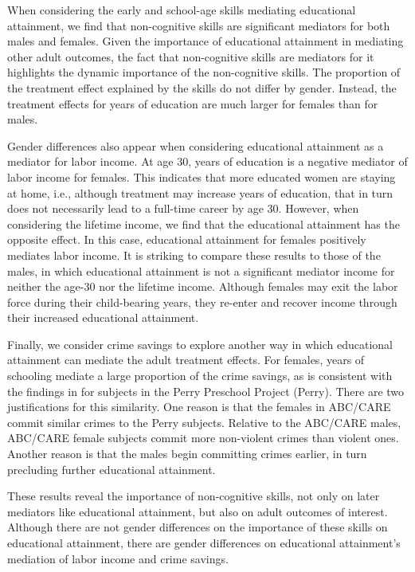 When considering the early and school-age skills mediating educational attainment, we find that non-cognitive skills are significant mediators for both males and females. Given the importance of educational attainment in mediating other adult outcomes, the fact that non-cognitive skills are mediators for it highlights the dynamic importance of the non-cognitive skills. 
The proportion of the treatment effect explained by the skills do not differ by gender. Instead, the treatment effects for years of education are much larger for females than for males. 

Gender differences also appear when considering educational attainment as a mediator for labor income. At age 30, years of education is a negative mediator of labor income for females. This indicates that more educated women are staying at home, i.e., although treatment may increase years of education, that in turn does not necessarily lead to a full-time career by age 30. However, when considering the lifetime income, we find that the educational attainment has the opposite effect. In this case, educational attainment for females positively mediates labor income. It is striking to compare these results to those of the males, in which educational attainment is not a significant mediator income for neither the age-30 nor the lifetime income. Although females may exit the labor force during their child-bearing years, they re-enter and recover income through their increased educational attainment. 

Finally, we consider crime savings to explore another way in which educational attainment can mediate the adult treatment effects. For females, years of schooling mediate a large proportion of the crime savings, as is consistent with the findings in \citet{Heckman_Pinto_etal_2013_PerryFactor} for subjects in the Perry Preschool Project (Perry). There are two justifications for this similarity. One reason is that the females in ABC/CARE commit similar crimes to the Perry subjects. Relative to the ABC/CARE males, ABC/CARE female subjects commit more non-violent crimes than violent ones. Another reason is that the males begin committing crimes earlier, in turn precluding further educational attainment.

These results reveal the importance of non-cognitive skills, not only on later mediators like educational attainment, but also on adult outcomes of interest. Although there are not gender differences on the importance of these skills on educational attainment, there are gender differences on educational attainment's mediation of labor income and crime savings.  
